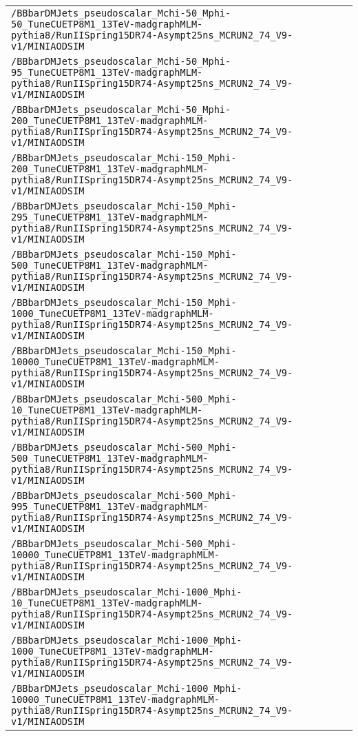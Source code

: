 \begin{center}
\begin{tabular}{l}
\verb!/BBbarDMJets_pseudoscalar_Mchi-50_Mphi-50_TuneCUETP8M1_13TeV-madgraphMLM-pythia8/RunIISpring15DR74-Asympt25ns_MCRUN2_74_V9-v1/MINIAODSIM! \tabularnewline
\verb!/BBbarDMJets_pseudoscalar_Mchi-50_Mphi-95_TuneCUETP8M1_13TeV-madgraphMLM-pythia8/RunIISpring15DR74-Asympt25ns_MCRUN2_74_V9-v1/MINIAODSIM! \tabularnewline
\verb!/BBbarDMJets_pseudoscalar_Mchi-50_Mphi-200_TuneCUETP8M1_13TeV-madgraphMLM-pythia8/RunIISpring15DR74-Asympt25ns_MCRUN2_74_V9-v1/MINIAODSIM! \tabularnewline
\verb!/BBbarDMJets_pseudoscalar_Mchi-150_Mphi-200_TuneCUETP8M1_13TeV-madgraphMLM-pythia8/RunIISpring15DR74-Asympt25ns_MCRUN2_74_V9-v1/MINIAODSIM! \tabularnewline
\verb!/BBbarDMJets_pseudoscalar_Mchi-150_Mphi-295_TuneCUETP8M1_13TeV-madgraphMLM-pythia8/RunIISpring15DR74-Asympt25ns_MCRUN2_74_V9-v1/MINIAODSIM! \tabularnewline
\verb!/BBbarDMJets_pseudoscalar_Mchi-150_Mphi-500_TuneCUETP8M1_13TeV-madgraphMLM-pythia8/RunIISpring15DR74-Asympt25ns_MCRUN2_74_V9-v1/MINIAODSIM! \tabularnewline
\verb!/BBbarDMJets_pseudoscalar_Mchi-150_Mphi-1000_TuneCUETP8M1_13TeV-madgraphMLM-pythia8/RunIISpring15DR74-Asympt25ns_MCRUN2_74_V9-v1/MINIAODSIM! \tabularnewline
\verb!/BBbarDMJets_pseudoscalar_Mchi-150_Mphi-10000_TuneCUETP8M1_13TeV-madgraphMLM-pythia8/RunIISpring15DR74-Asympt25ns_MCRUN2_74_V9-v1/MINIAODSIM! \tabularnewline
\verb!/BBbarDMJets_pseudoscalar_Mchi-500_Mphi-10_TuneCUETP8M1_13TeV-madgraphMLM-pythia8/RunIISpring15DR74-Asympt25ns_MCRUN2_74_V9-v1/MINIAODSIM! \tabularnewline
\verb!/BBbarDMJets_pseudoscalar_Mchi-500_Mphi-500_TuneCUETP8M1_13TeV-madgraphMLM-pythia8/RunIISpring15DR74-Asympt25ns_MCRUN2_74_V9-v1/MINIAODSIM! \tabularnewline
\verb!/BBbarDMJets_pseudoscalar_Mchi-500_Mphi-995_TuneCUETP8M1_13TeV-madgraphMLM-pythia8/RunIISpring15DR74-Asympt25ns_MCRUN2_74_V9-v1/MINIAODSIM! \tabularnewline
\verb!/BBbarDMJets_pseudoscalar_Mchi-500_Mphi-10000_TuneCUETP8M1_13TeV-madgraphMLM-pythia8/RunIISpring15DR74-Asympt25ns_MCRUN2_74_V9-v1/MINIAODSIM! \tabularnewline
\verb!/BBbarDMJets_pseudoscalar_Mchi-1000_Mphi-10_TuneCUETP8M1_13TeV-madgraphMLM-pythia8/RunIISpring15DR74-Asympt25ns_MCRUN2_74_V9-v1/MINIAODSIM! \tabularnewline
\verb!/BBbarDMJets_pseudoscalar_Mchi-1000_Mphi-1000_TuneCUETP8M1_13TeV-madgraphMLM-pythia8/RunIISpring15DR74-Asympt25ns_MCRUN2_74_V9-v1/MINIAODSIM! \tabularnewline
\verb!/BBbarDMJets_pseudoscalar_Mchi-1000_Mphi-10000_TuneCUETP8M1_13TeV-madgraphMLM-pythia8/RunIISpring15DR74-Asympt25ns_MCRUN2_74_V9-v1/MINIAODSIM! \tabularnewline
\hline
\end{tabular}\end{center}
